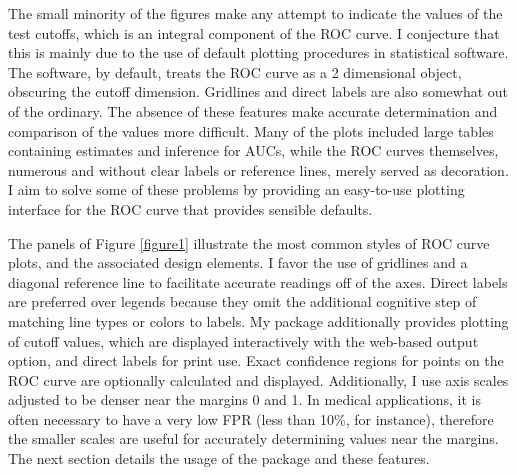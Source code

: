 \documentclass[codesnippet]{jss}
\begin{document}
The small minority of the figures make any attempt to indicate the
values of the test cutoffs, which is an integral component of the ROC
curve. I conjecture that this is mainly due to the use of default
plotting procedures in statistical software. The software, by default,
treats the ROC curve as a 2 dimensional object, obscuring the cutoff
dimension. Gridlines and direct labels are also somewhat out of the
ordinary. The absence of these features make accurate determination and
comparison of the values more difficult. Many of the plots included
large tables containing estimates and inference for AUCs, while the ROC
curves themselves, numerous and without clear labels or reference lines,
merely served as decoration. I aim to solve some of these problems by
providing an easy-to-use plotting interface for the ROC curve that
provides sensible defaults.

The panels of Figure \ref{figure1} illustrate the most common styles of
ROC curve plots, and the associated design elements. I favor the use of
gridlines and a diagonal reference line to facilitate accurate readings
off of the axes. Direct labels are preferred over legends because they
omit the additional cognitive step of matching line types or colors to
labels. My  package additionally provides plotting of
cutoff values, which are displayed interactively with the web-based
output option, and direct labels for print use. Exact confidence regions
for points on the ROC curve are optionally calculated and displayed.
Additionally, I use axis scales adjusted to be denser near the margins 0
and 1. In medical applications, it is often necessary to have a very low
FPR (less than 10\%, for instance), therefore the smaller scales are
useful for accurately determining values near the margins. The next
section details the usage of the   package and
these features.
\end{document}
